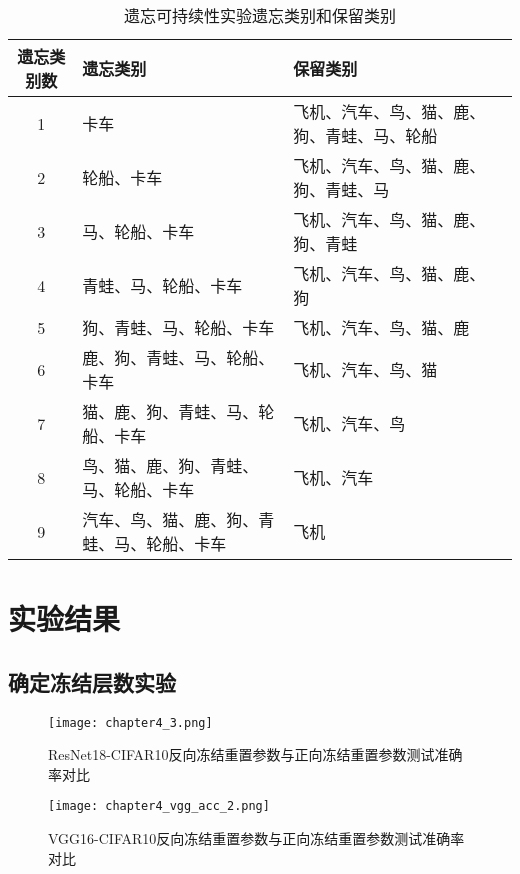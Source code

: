 \begin{table}
    \centering
    \caption{遗忘可持续性实验遗忘类别和保留类别}
    \begin{tabular}{cp{6cm}p{6cm}p{3cm}}
      \toprule
      遗忘类别数  & 遗忘类别 & 保留类别  \\
      \midrule
      1 & 卡车  & 飞机、汽车、鸟、猫、鹿、狗、青蛙、马、轮船  \\
      2 & 轮船、卡车  & 飞机、汽车、鸟、猫、鹿、狗、青蛙、马  \\
      3 & 马、轮船、卡车  & 飞机、汽车、鸟、猫、鹿、狗、青蛙  \\
      4 & 青蛙、马、轮船、卡车  & 飞机、汽车、鸟、猫、鹿、狗  \\
      5 & 狗、青蛙、马、轮船、卡车  & 飞机、汽车、鸟、猫、鹿  \\
      6 & 鹿、狗、青蛙、马、轮船、卡车  & 飞机、汽车、鸟、猫  \\
      7 & 猫、鹿、狗、青蛙、马、轮船、卡车  & 飞机、汽车、鸟  \\
      8 & 鸟、猫、鹿、狗、青蛙、马、轮船、卡车  & 飞机、汽车  \\
      9 & 汽车、鸟、猫、鹿、狗、青蛙、马、轮船、卡车  & 飞机  \\
      \bottomrule
    \end{tabular}
    \label{tab:forget-continuous-kinds}
\end{table}

\section{实验结果}
\subsection{确定冻结层数实验}
\begin{figure}
    \centering
    \texttt{[image: chapter4\_3.png]}
    \caption{ResNet18-CIFAR10反向冻结重置参数与正向冻结重置参数测试准确率对比}
    \label{fig:chapter4_3}
\end{figure}

\begin{figure}
    \centering
    \texttt{[image: chapter4\_vgg\_acc\_2.png]}
    \caption{VGG16-CIFAR10反向冻结重置参数与正向冻结重置参数测试准确率对比}
    \label{fig:chapter4_vgg_acc_2}
\end{figure}

